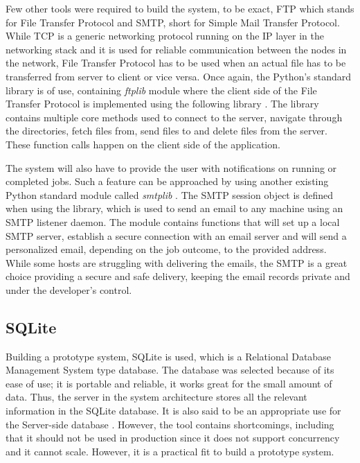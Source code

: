 \documentclass[10pt]{report}
\begin{document}
Few other tools were required to build the system, to be exact, FTP which stands for File Transfer Protocol and SMTP, short for Simple Mail Transfer Protocol. While TCP is a generic networking protocol running on the IP layer in the networking stack and it is used for reliable communication between the nodes in the network, File Transfer Protocol has to be used when an actual file has to be transferred from server to client or vice versa. Once again, the Python's standard library is of use, containing \textit{ftplib} module where the client side of the File Transfer Protocol is implemented using the following library \cite{ftp}. The library contains multiple core methods used to connect to the server, navigate through the directories, fetch files from, send files to and delete files from the server. These function calls happen on the client side of the application.
\newline

The system will also have to provide the user with notifications on running or completed jobs. Such a feature can be approached by using another existing Python standard module called \textit{smtplib} \cite{smtp}. The SMTP session object is defined when using the library, which is used to send an email to any machine using an SMTP listener daemon. The module contains functions that will set up a local SMTP server, establish a secure connection with an email server and will send a personalized email, depending on the job outcome, to the provided address. While some hosts are struggling with delivering the emails, the SMTP is a great choice providing a secure and safe delivery, keeping the email records private and under the developer's control.

\subsection{SQLite}

Building a prototype system, SQLite is used, which is a Relational Database Management System type database. The database was selected because of its ease of use; it is portable and reliable, it works great for the small amount of data. Thus, the server in the system architecture stores all the relevant information in the SQLite database. It is also said to be an appropriate use for the Server-side database \cite{sqlite}. However, the tool contains shortcomings, including that it should not be used in production since it does not support concurrency and it cannot scale. However, it is a practical fit to build a prototype system.
\end{document}
